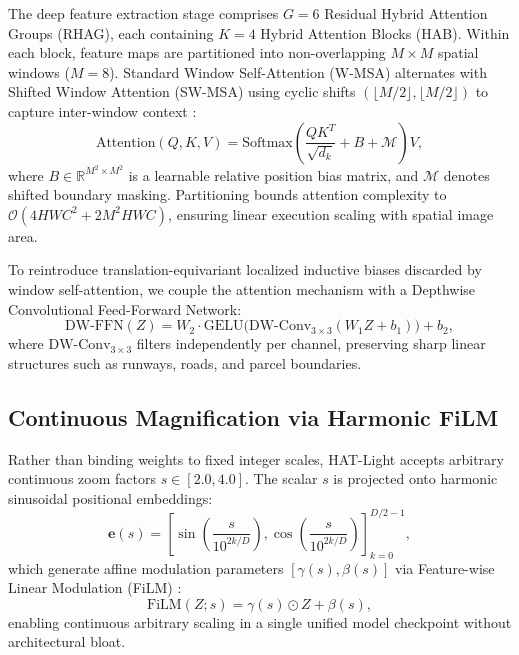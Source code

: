 \documentclass[letterpaper,journal,twoside]{IEEEtran}
\begin{document}
The deep feature extraction stage comprises $G = 6$ Residual Hybrid Attention Groups (RHAG), each containing $K = 4$ Hybrid Attention Blocks (HAB). Within each block, feature maps are partitioned into non-overlapping $M \times M$ spatial windows ($M = 8$). Standard Window Self-Attention (W-MSA) alternates with Shifted Window Attention (SW-MSA) using cyclic shifts $(\lfloor M/2 \rfloor, \lfloor M/2 \rfloor)$ to capture inter-window context \cite{liu2021swin}:
\begin{equation}
\text{Attention}(Q, K, V) = \text{Softmax}\left(\frac{QK^T}{\sqrt{d_k}} + B + \mathcal{M}\right)V,
\label{eq:attention}
\end{equation}
where $B \in \mathbb{R}^{M^2 \times M^2}$ is a learnable relative position bias matrix, and $\mathcal{M}$ denotes shifted boundary masking. Partitioning bounds attention complexity to $\mathcal{O}(4HWC^2 + 2M^2HWC)$, ensuring linear execution scaling with spatial image area.

To reintroduce translation-equivariant localized inductive biases discarded by window self-attention, we couple the attention mechanism with a Depthwise Convolutional Feed-Forward Network:
\begin{equation}
\text{DW-FFN}(Z) = W_2 \cdot \text{GELU}\Big(\text{DW-Conv}_{3\times3}(W_1 Z + b_1)\Big) + b_2,
\label{eq:dwffn}
\end{equation}
where $\text{DW-Conv}_{3\times3}$ filters independently per channel, preserving sharp linear structures such as runways, roads, and parcel boundaries.

\subsection{Continuous Magnification via Harmonic FiLM}
Rather than binding weights to fixed integer scales, HAT-Light accepts arbitrary continuous zoom factors $s \in [2.0, 4.0]$. The scalar $s$ is projected onto harmonic sinusoidal positional embeddings:
\begin{equation}
\mathbf{e}(s) = \left[ \sin\left(\frac{s}{10^{2k/D}}\right), \cos\left(\frac{s}{10^{2k/D}}\right) \right]_{k=0}^{D/2-1},
\label{eq:harmonic}
\end{equation}
which generate affine modulation parameters $[\gamma(s), \beta(s)]$ via Feature-wise Linear Modulation (FiLM) \cite{perez2018film}:
\begin{equation}
\text{FiLM}(Z; s) = \gamma(s) \odot Z + \beta(s),
\label{eq:film}
\end{equation}
enabling continuous arbitrary scaling in a single unified model checkpoint without architectural bloat.
\end{document}
